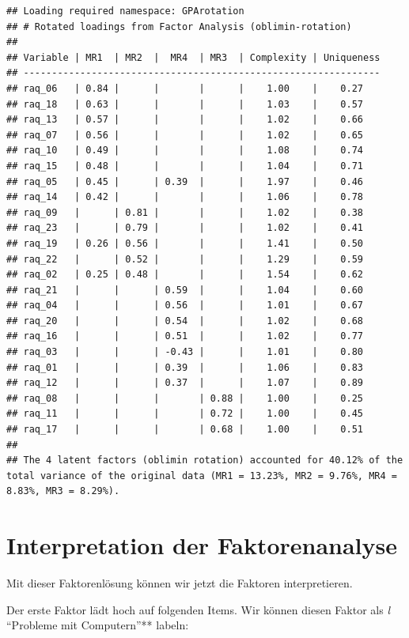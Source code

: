 \documentclass[
  10pt,
  letterpaper,
  a4paper, twoside]{scrreprt}
\begin{document}
\begin{verbatim}
## Loading required namespace: GPArotation
## # Rotated loadings from Factor Analysis (oblimin-rotation)
## 
## Variable | MR1  | MR2  |  MR4  | MR3  | Complexity | Uniqueness
## ---------------------------------------------------------------
## raq_06   | 0.84 |      |       |      |    1.00    |    0.27   
## raq_18   | 0.63 |      |       |      |    1.03    |    0.57   
## raq_13   | 0.57 |      |       |      |    1.02    |    0.66   
## raq_07   | 0.56 |      |       |      |    1.02    |    0.65   
## raq_10   | 0.49 |      |       |      |    1.08    |    0.74   
## raq_15   | 0.48 |      |       |      |    1.04    |    0.71   
## raq_05   | 0.45 |      | 0.39  |      |    1.97    |    0.46   
## raq_14   | 0.42 |      |       |      |    1.06    |    0.78   
## raq_09   |      | 0.81 |       |      |    1.02    |    0.38   
## raq_23   |      | 0.79 |       |      |    1.02    |    0.41   
## raq_19   | 0.26 | 0.56 |       |      |    1.41    |    0.50   
## raq_22   |      | 0.52 |       |      |    1.29    |    0.59   
## raq_02   | 0.25 | 0.48 |       |      |    1.54    |    0.62   
## raq_21   |      |      | 0.59  |      |    1.04    |    0.60   
## raq_04   |      |      | 0.56  |      |    1.01    |    0.67   
## raq_20   |      |      | 0.54  |      |    1.02    |    0.68   
## raq_16   |      |      | 0.51  |      |    1.02    |    0.77   
## raq_03   |      |      | -0.43 |      |    1.01    |    0.80   
## raq_01   |      |      | 0.39  |      |    1.06    |    0.83   
## raq_12   |      |      | 0.37  |      |    1.07    |    0.89   
## raq_08   |      |      |       | 0.88 |    1.00    |    0.25   
## raq_11   |      |      |       | 0.72 |    1.00    |    0.45   
## raq_17   |      |      |       | 0.68 |    1.00    |    0.51   
## 
## The 4 latent factors (oblimin rotation) accounted for 40.12% of the total variance of the original data (MR1 = 13.23%, MR2 = 9.76%, MR4 = 8.83%, MR3 = 8.29%).
\end{verbatim}

\section{Interpretation der
Faktorenanalyse}\label{interpretation-der-faktorenanalyse}

Mit dieser Faktorenlösung können wir jetzt die Faktoren interpretieren.

Der erste Faktor lädt hoch auf folgenden Items. Wir können diesen Faktor
als \emph{l} \enquote{Probleme mit Computern}** labeln:
\end{document}
